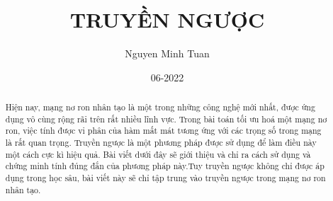 \documentclass{article}
\title{TRUYỀN NGƯỢC}
\author{Nguyen Minh Tuan}
\affil{Hanoi University of Science and Technology}
\date{06-2022}
\begin{document}
\begin{titlingpage}
    \maketitle
    \begin{abstract}
        \large
        Hiện nay, mạng nơ ron nhân tạo là một trong những công nghệ mới nhất, được ứng dụng vô cùng rộng rãi trên rất nhiều lĩnh vực. Trong bài toán tối ưu hoá một mạng nơ ron, việc tính được vi phân của hàm mất mát tương ứng với các trọng số trong mạng là rất quan trọng. Truyền ngược là một phương pháp được sử dụng để làm điều này một cách cực kì hiệu quả. Bài viết dưới đây sẽ giới thiệu và chỉ ra cách sử dụng và chứng minh tính đúng đắn của phương pháp này.Tuy truyền ngược không chỉ được áp dụng trong học sâu, bài viết này sẽ chỉ tập trung vào truyền ngược trong mạng nơ ron nhân tạo.
    \end{abstract}
\end{titlingpage}


\newpage
\onehalfspacing
\large
\end{document}
